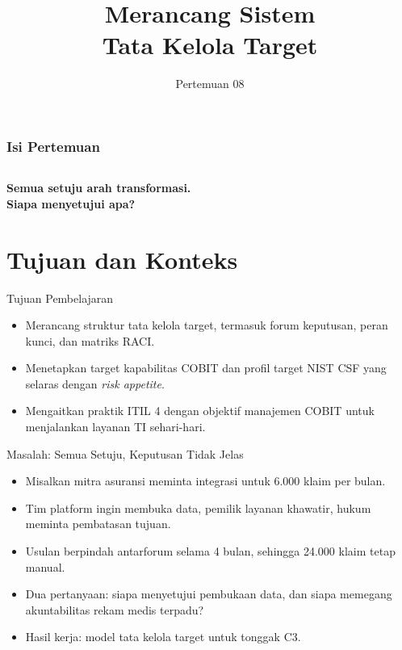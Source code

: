 \documentclass[aspectratio=169, table, 12pt]{beamer}
\title{\Huge Merancang Sistem\\ \vspace{10pt} Tata Kelola Target}
\date{Pertemuan 08}
\begin{document}
\frame{\titlepage}

\begin{frame}
  \frametitle{Isi Pertemuan}
  \vspace{14pt}
  \begin{columns}[t]
    {\small\tableofcontents[sections={1-4}]}

    {\small\tableofcontents[sections={5-8}]}
  \end{columns}
\end{frame}

\begin{frame}{\hfill}
  \centering
  \Huge{\textbf{Semua setuju arah transformasi.\\Siapa menyetujui apa?}}
\end{frame}

\section{Tujuan dan Konteks}

\begin{frame}{{\Large Tujuan Pembelajaran}}
  \vspace{10pt}
  \begin{itemize}
    \item Merancang struktur tata kelola target, termasuk forum keputusan, peran kunci, dan matriks
          RACI.
    \item Menetapkan target kapabilitas COBIT dan profil target NIST CSF yang selaras dengan
          \textit{risk appetite}.
    \item Mengaitkan praktik ITIL 4 dengan objektif manajemen COBIT untuk menjalankan layanan TI
          sehari-hari.
  \end{itemize}
\end{frame}

\begin{frame}{{\Large Masalah: Semua Setuju, Keputusan Tidak Jelas}}
  \vspace{6pt}
  \small
  \begin{itemize}
    \item Misalkan mitra asuransi meminta integrasi untuk 6.000 klaim per bulan.
    \item Tim platform ingin membuka data, pemilik layanan khawatir, hukum meminta pembatasan
          tujuan.
    \item Usulan berpindah antarforum selama 4 bulan, sehingga 24.000 klaim tetap manual.
    \item Dua pertanyaan: siapa menyetujui pembukaan data, dan siapa memegang akuntabilitas rekam
          medis terpadu?
    \item Hasil kerja: model tata kelola target untuk tonggak C3.
  \end{itemize}
\end{frame}
\end{document}
